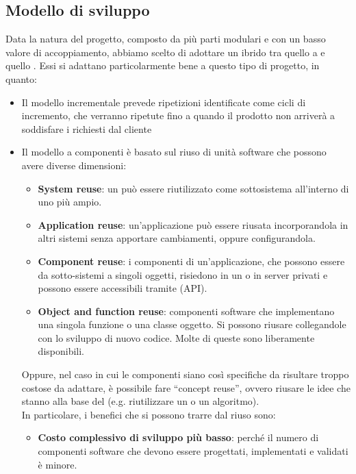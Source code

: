 	\subsection{Modello di sviluppo}\label{modello di sviluppo}
	Data la natura del progetto, composto da più parti modulari e con un basso valore di accoppiamento, abbiamo scelto di adottare un  ibrido tra quello a  e quello .
	Essi si adattano particolarmente bene a questo tipo di progetto, in quanto:
	\begin{itemize}
		\item Il modello incrementale prevede ripetizioni identificate come cicli di incremento,
		che verranno ripetute fino a quando il prodotto non arriverà a soddisfare i  richiesti dal cliente
		\item Il modello a componenti è basato sul riuso di unità software che possono avere diverse dimensioni:
		\begin{itemize}
			\item \textbf{System reuse}: un  può essere riutilizzato come sottosistema all'interno di uno più ampio.
			\item \textbf{Application reuse}: un'applicazione può essere riusata incorporandola in altri sistemi senza apportare cambiamenti, 
				oppure configurandola.
			\item \textbf{Component reuse}: i componenti di un'applicazione, che possono essere da sotto-sistemi a singoli oggetti, risiedono
				in un  o in server privati e possono essere accessibili tramite  (API).
			\item \textbf{Object and function reuse}: componenti software che implementano una singola funzione o una classe oggetto. Si 
				possono riusare collegandole con lo sviluppo di nuovo codice. Molte di queste sono liberamente disponibili. 
		\end{itemize}
		Oppure, nel caso in cui le componenti siano così specifiche da risultare troppo costose da adattare,
		è possibile fare ``concept reuse'', ovvero riusare le idee che stanno alla base del  (e.g. riutilizzare un  o un algoritmo). \\
		In particolare, i benefici che si possono trarre dal riuso sono:
		\begin{itemize}
			\item \textbf{Costo complessivo di sviluppo più basso}: perché il numero di componenti software che devono essere progettati, implementati e validati è minore.

\end{itemize}
\end{itemize}
